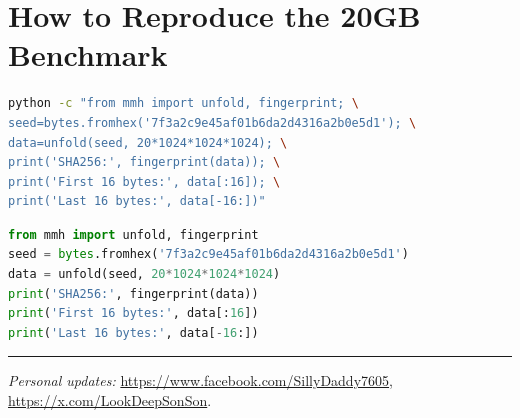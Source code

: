 \documentclass[11pt,a4paper]{article}
\begin{document}
\FloatBarrier
\section*{How to Reproduce the 20GB Benchmark}
\begin{lstlisting}[language=bash,caption={Command-line unfold of 20GB from the MMH seed}]
python -c "from mmh import unfold, fingerprint; \
seed=bytes.fromhex('7f3a2c9e45af01b6da2d4316a2b0e5d1'); \
data=unfold(seed, 20*1024*1024*1024); \
print('SHA256:', fingerprint(data)); \
print('First 16 bytes:', data[:16]); \
print('Last 16 bytes:', data[-16:])"
\end{lstlisting}

\begin{lstlisting}[language=python,caption={Python script to unfold and verify 20GB from the MMH seed}]
from mmh import unfold, fingerprint
seed = bytes.fromhex('7f3a2c9e45af01b6da2d4316a2b0e5d1')
data = unfold(seed, 20*1024*1024*1024)
print('SHA256:', fingerprint(data))
print('First 16 bytes:', data[:16])
print('Last 16 bytes:', data[-16:])
\end{lstlisting}

\vfill
\hrule
\vspace{0.5em}
\noindent\footnotesize\textit{Personal updates:} \url{https://www.facebook.com/SillyDaddy7605}, \url{https://x.com/LookDeepSonSon}.
\end{document}
